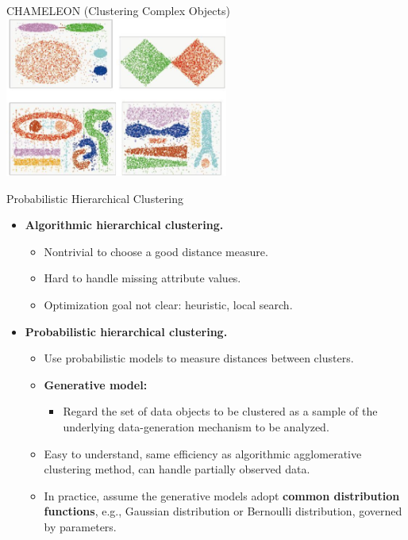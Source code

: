 \begin{frame}{CHAMELEON (Clustering Complex Objects)}
	\centering
	\includegraphics[width=0.55\textwidth]{img/cluster.jpeg}
\end{frame}

\begin{frame}{Probabilistic Hierarchical Clustering}
	\centering
	\begin{itemize}
		\item \textbf{Algorithmic hierarchical clustering.}
		\begin{itemize}
			\item Nontrivial to choose a good distance measure.
			\item Hard to handle missing attribute values.
			\item Optimization goal not clear: heuristic, local search.
		\end{itemize}
		\item \textbf{Probabilistic hierarchical clustering.}
		\begin{itemize}
			\item Use probabilistic models to measure distances between 
			clusters.
			\item \textbf{\color{airforceblue}Generative model:}
			\begin{itemize}
				\item Regard the set of data objects to be clustered as a 
				sample of the underlying data-generation mechanism to be 
				analyzed.
			\end{itemize}
			\item Easy to understand, same efficiency as algorithmic 
			agglomerative clustering method, can handle partially observed data.
			\item In practice, assume the generative models adopt 
			\textbf{\color{airforceblue}common distribution functions}, e.g., 
			Gaussian distribution or Bernoulli distribution, governed by 
			parameters.
		\end{itemize}
	\end{itemize}
\end{frame}


